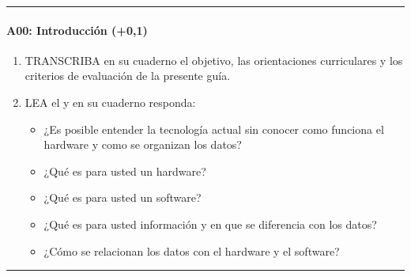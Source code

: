 \documentclass[letterpaper,10pt,spanish]{sphinxmanual}
\begin{document}
\bigskip\hrule\bigskip



\paragraph{A00: Introducción (+0,1)}
\label{\detokenize{cursos/ofimatica11/periodo01/G01:a00-introduccion-0-1}}
\sphinxAtStartPar
{}
\begin{enumerate}
%
\item {} 
\sphinxAtStartPar
TRANSCRIBA en su cuaderno el objetivo, las orientaciones curriculares y los criterios de evaluación de la presente guía.

\item {} 
\sphinxAtStartPar
LEA el  y en su cuaderno responda:
\begin{itemize}
\item {} 
\sphinxAtStartPar
¿Es posible entender la tecnología actual sin conocer como funciona el hardware y como se organizan los datos?

\item {} 
\sphinxAtStartPar
¿Qué es para usted un hardware?

\item {} 
\sphinxAtStartPar
¿Qué es para usted un software?

\item {} 
\sphinxAtStartPar
¿Qué es para usted información y en que se diferencia con los datos?

\item {} 
\sphinxAtStartPar
¿Cómo se relacionan los datos con el hardware y el software?

\end{itemize}

\end{enumerate}


\bigskip\hrule\bigskip
\end{document}
